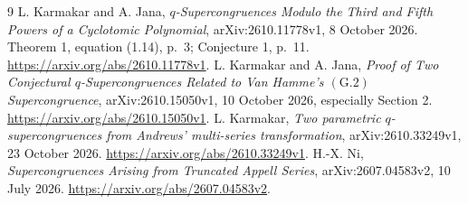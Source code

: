 \documentclass[11pt,a4paper]{article}
\begin{document}
\begin{thebibliography}{9}
 L. Karmakar and A. Jana, \emph{$q$-Supercongruences Modulo the
Third and Fifth Powers of a Cyclotomic Polynomial}, arXiv:2610.11778v1,
8 October 2026. Theorem 1, equation (1.14), p.~3; Conjecture 1, p.~11.
\url{https://arxiv.org/abs/2610.11778v1}.
 L. Karmakar and A. Jana, \emph{Proof of Two Conjectural
$q$-Supercongruences Related to Van Hamme's $(\mathrm{G}.2)$ Supercongruence},
arXiv:2610.15050v1, 10 October 2026, especially Section 2.
\url{https://arxiv.org/abs/2610.15050v1}.
 L. Karmakar, \emph{Two parametric $q$-supercongruences
from Andrews' multi-series transformation}, arXiv:2610.33249v1,
23 October 2026. \url{https://arxiv.org/abs/2610.33249v1}.
 H.-X. Ni, \emph{Supercongruences Arising from Truncated
Appell Series}, arXiv:2607.04583v2, 10 July 2026.
\url{https://arxiv.org/abs/2607.04583v2}.
\end{thebibliography}
\end{document}
